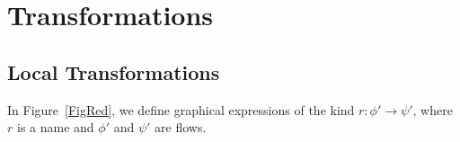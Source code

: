 \chapter{Transformations}

\section{Local Transformations}

\begin{definition}
In Figure~\ref{FigRed}, we define graphical expressions of the kind $r\colon\phi'\to\psi'$, where $r$ is a name and $\phi'$ and $\psi'$ are flows.
\end{definition}


